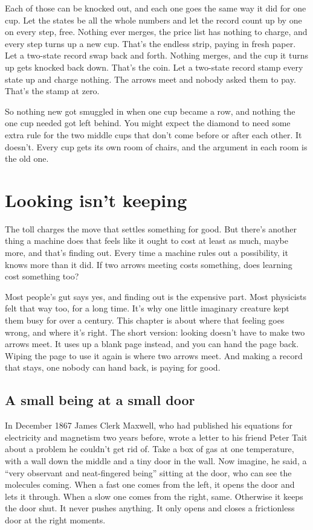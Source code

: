 \documentclass[11pt,twoside]{article}
\theoremstyle{thielethm}
\theoremstyle{thieledef}
\theoremstyle{thieledef}
\theoremstyle{thieledef}
\theoremstyle{thielethm}
\theoremstyle{thieleobs}
\theoremstyle{thielethm}
\begin{document}
Each of those can be knocked out, and each one goes the same way it did for one cup. Let the states be all the whole numbers and let the record count up by one on every step, free. Nothing ever merges, the price list has nothing to charge, and every step turns up a new cup. That's the endless strip, paying in fresh paper. Let a two-state record swap back and forth. Nothing merges, and the cup it turns up gets knocked back down. That's the coin. Let a two-state record stamp every state up and charge nothing. The arrows meet and nobody asked them to pay. That's the stamp at zero.

So nothing new got smuggled in when one cup became a row, and nothing the one cup needed got left behind. You might expect the diamond to need some extra rule for the two middle cups that don't come before or after each other. It doesn't. Every cup gets its own room of chairs, and the argument in each room is the old one.

\section{Looking isn't keeping}
\label{sec:looking}

The toll charges the move that settles something for good. But there's another thing a machine does that feels like it ought to cost at least as much, maybe more, and that's finding out. Every time a machine rules out a possibility, it knows more than it did. If two arrows meeting costs something, does learning cost something too?

Most people's gut says yes, and finding out is the expensive part. Most physicists felt that way too, for a long time. It's why one little imaginary creature kept them busy for over a century. This chapter is about where that feeling goes wrong, and where it's right. The short version: looking doesn't have to make two arrows meet. It uses up a blank page instead, and you can hand the page back. Wiping the page to use it again is where two arrows meet. And making a record that stays, one nobody can hand back, is paying for good.

\subsection{A small being at a small door}

In December 1867 James Clerk Maxwell, who had published his equations for electricity and magnetism two years before, wrote a letter to his friend Peter Tait about a problem he couldn't get rid of. Take a box of gas at one temperature, with a wall down the middle and a tiny door in the wall. Now imagine, he said, a ``very observant and neat-fingered being'' sitting at the door, who can see the molecules coming. When a fast one comes from the left, it opens the door and lets it through. When a slow one comes from the right, same. Otherwise it keeps the door shut. It never pushes anything. It only opens and closes a frictionless door at the right moments.
\end{document}
